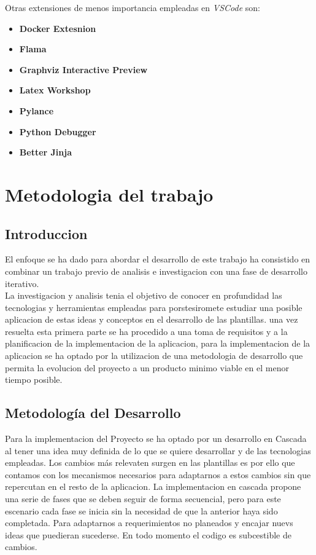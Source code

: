 \documentclass[12pt, a4paper, twoside]{article}
\begin{document}
Otras extensiones de menos importancia empleadas en \textit{VSCode} son:
\begin{itemize}
    \item \textbf{Docker Extesnion}
    \item \textbf{Flama}
    \item \textbf{Graphviz Interactive Preview}
    \item \textbf{Latex Workshop}
    \item \textbf{Pylance}
    \item \textbf{Python Debugger}
    \item \textbf{Better Jinja}
\end{itemize}










\section{Metodologia del trabajo}
\label{sec:Metodologia}
\subsection{Introduccion}
El enfoque se ha dado para abordar el desarrollo de este trabajo ha consistido en combinar un trabajo previo de analisis e investigacion con una fase de desarrollo iterativo.
\\La investigacion y analisis tenia el objetivo de conocer en profundidad las tecnologias y herramientas empleadas 
para porstesiromete estudiar una posible aplicacion de estas ideas y conceptos en el desarrollo de las plantillas.
una vez resuelta esta primera parte se ha procedido a una toma de requisitos y a la planificacion de la implementacion de la aplicacion,
para la implementacion de la aplicacion se ha optado por la utilizacion de una metodologia de desarrollo que permita la evolucion del proyecto a un producto minimo viable en el menor tiempo posible.
\subsection{Metodología del Desarrollo}
Para la implementacion del Proyecto se ha optado por un desarrollo en Cascada al tener una idea muy definida de lo que se quiere desarrollar y de las tecnologias empleadas.
Los cambios más relevaten surgen en las plantillas es por ello que contamos con los mecanismos necesarios para adaptarnos a estos cambios sin que repercutan en el resto de la aplicacion.
La implementacion en cascada propone una serie de fases que se deben seguir de forma secuencial, pero para este escenario cada fase se inicia sin la necesidad de que la anterior haya sido completada.
Para adaptarnos a requerimientos no planeados y encajar nuevs ideas que puedieran sucederse. En todo momento el codigo es subcestible de cambios.
\end{document}
